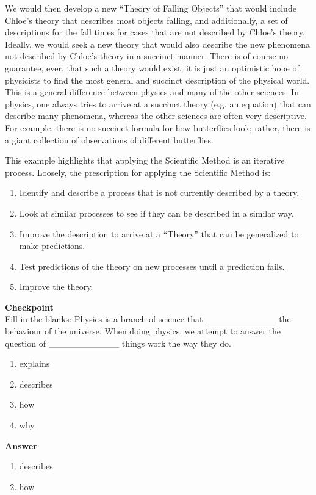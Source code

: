 We would then develop a new ``Theory of Falling Objects'' that would include Chloe's theory that describes most objects falling, and additionally, a set of descriptions for the fall times for cases that are not described by Chloe's theory. Ideally, we would seek a new theory that would also describe the new phenomena not described by Chloe's theory in a succinct manner. There is of course no guarantee, ever, that such a theory would exist; it is just an optimistic hope of physicists to find the most general and succinct description of the physical world. This is a general difference between physics and many of the other sciences. In physics, one always tries to arrive at a succinct theory (e.g. an equation) that can describe many phenomena, whereas the other sciences are often very descriptive. For example, there is no succinct formula for how butterflies look; rather, there is a giant collection of observations of different butterflies.

This example highlights that applying the Scientific Method is an iterative process. Loosely, the prescription for applying the Scientific Method is:

\begin{enumerate}
\item Identify and describe a process that is not currently described by a theory.
\item Look at similar processes to see if they can be described in a similar way.
\item Improve the description to arrive at a ``Theory'' that can be generalized to make predictions.
\item Test predictions of the theory on new processes until a prediction fails.
\item Improve the theory.
\end{enumerate}

\begin{framed}
\textbf{Checkpoint}\\
Fill in the blanks: Physics is a branch of science that \_\_\_\_\_\_\_\_\_\_\_ the behaviour of the universe. When doing physics, we attempt to answer the question of \_\_\_\_\_\_\_\_\_\_\_ things work the way they do.

\begin{enumerate}
\item explains
\item describes
\item how
\item why
\end{enumerate}

\begin{framed}
\textbf{Answer}\\
\begin{enumerate}
\item describes
\item how
\end{enumerate}
\end{framed}
\end{framed}

